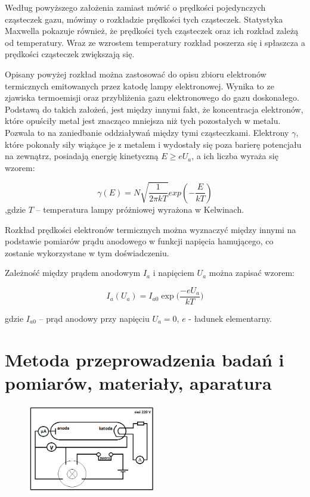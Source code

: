 \documentclass[a4paper,10pt]{article}
\begin{document}
Według powyższego założenia zamiast mówić o prędkości pojedynczych cząsteczek gazu, mówimy o rozkładzie prędkości tych cząsteczek. Statystyka Maxwella pokazuje również, że prędkości tych cząsteczek oraz ich rozkład zależą  od temperatury. Wraz ze wzrostem temperatury rozkład poszerza się i spłaszcza a prędkości cząsteczek zwiększają się.

Opisany powyżej rozkład można zastosować  do opisu zbioru elektronów termicznych emitowanych przez katodę lampy elektronowej. Wynika to ze zjawiska termoemisji oraz przybliżenia gazu elektronowego do gazu doskonałego. Podstawą do takich założeń, jest między innymi fakt, że koncentracja elektronów, które opuściły metal jest znacząco mniejsza niż tych pozostałych w metalu. Pozwala to na zaniedbanie oddziaływań między tymi cząsteczkami. Elektrony $\gamma$, które pokonały siły wiążące je z metalem i wydostały się poza barierę potencjału na zewnątrz, posiadają energię kinetyczną $E \geq eU_a$, a ich liczba wyraża się wzorem:

\begin{equation}
\gamma (E) = N \sqrt{\frac{1}{2\pi kT}}exp(-\frac{E}{kT})
\end{equation}
,gdzie $T$ – temperatura lampy  próżniowej wyrażona w Kelwinach.
\vspace{0,4cm}

Rozkład prędkości elektronów termicznych można wyznaczyć między innymi na podstawie pomiarów prądu anodowego w funkcji napięcia hamującego, co zostanie wykorzystane w tym doświadczeniu.

Zależność między prądem anodowym $I_a$ i napięciem $U_a$ można zapisać wzorem:

\begin{equation}
  I_a(U_a) = I_{a0}\exp{\Big(\frac{-eU_a}{kT}\Big)}
\end{equation}

gdzie $I_{a0}$ – prąd anodowy przy napięciu $U_a = 0$,  $e$ - ładunek elementarny.


\section{Metoda przeprowadzenia badań i pomiarów, materiały, aparatura}

\begin{figure}[H]
\centering
\includegraphics[width=0.5\textwidth]{schemat.png}
\end{figure}
\end{document}
